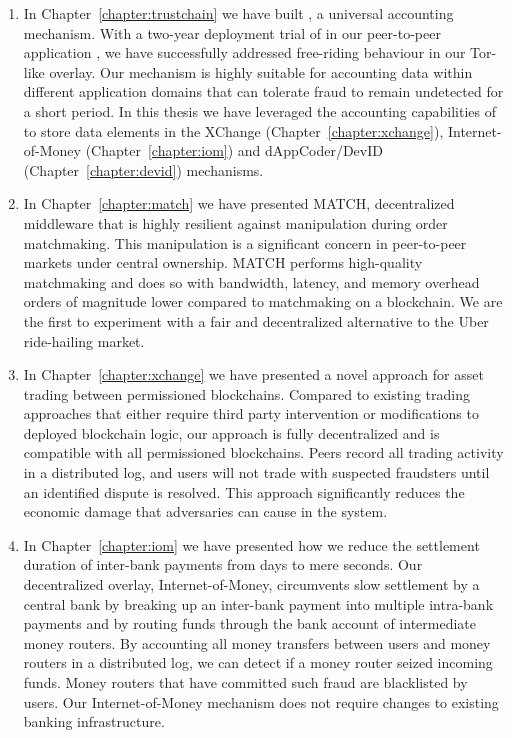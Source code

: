 \begin{enumerate}
	\item In Chapter~\ref{chapter:trustchain} we have built \TrustChain{}, a universal accounting mechanism.
	With a two-year deployment trial of \TrustChain{} in our peer-to-peer application \Tribler{}, we have successfully addressed free-riding behaviour in our Tor-like overlay.
	Our \TrustChain{} mechanism is highly suitable for accounting data within different application domains that can tolerate fraud to remain undetected for a short period.
	In this thesis we have leveraged the accounting capabilities of \TrustChain{} to store data elements in the XChange (Chapter~\ref{chapter:xchange}), Internet-of-Money (Chapter~\ref{chapter:iom}) and dAppCoder/DevID (Chapter~\ref{chapter:devid}) mechanisms.
	
	\item In Chapter~\ref{chapter:match} we have presented MATCH, decentralized middleware that is highly resilient against manipulation during order matchmaking.
	This manipulation is a significant concern in peer-to-peer markets under central ownership.
	MATCH performs high-quality matchmaking and does so with bandwidth, latency, and memory overhead orders of magnitude lower compared to matchmaking on a blockchain.
	We are the first to experiment with a fair and decentralized alternative to the Uber ride-hailing market.
	
	\item In Chapter~\ref{chapter:xchange} we have presented a novel approach for asset trading between permissioned blockchains.
	Compared to existing trading approaches that either require third party intervention or modifications to deployed blockchain logic, our approach is fully decentralized and is compatible with all permissioned blockchains.
	Peers record all trading activity in a distributed log, and users will not trade with suspected fraudsters until an identified dispute is resolved.
	This approach significantly reduces the economic damage that adversaries can cause in the system.
	
	\item In Chapter~\ref{chapter:iom} we have presented how we reduce the settlement duration of inter-bank payments from days to mere seconds.
	Our decentralized overlay, Internet-of-Money, circumvents slow settlement by a central bank by breaking up an inter-bank payment into multiple intra-bank payments and by routing funds through the bank account of intermediate money routers.
	By accounting all money transfers between users and money routers in a distributed log, we can detect if a money router seized incoming funds.
	Money routers that have committed such fraud are blacklisted by users.
	Our Internet-of-Money mechanism does not require changes to existing banking infrastructure.
	

\end{enumerate}
